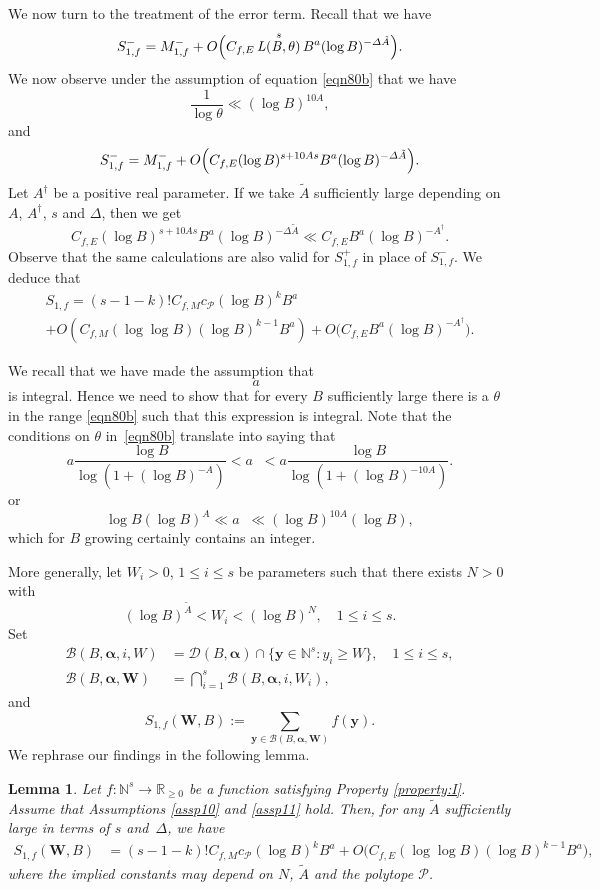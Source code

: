 \documentclass[11pt]{article}
\numberwithin{equation}{section}
\DeclareMathOperator{\LBt}{\mathit{L(B,\theta)}}
\newcommand{\cB}{\mathcal{B}}
\newcommand{\cD}{\mathcal{D}}
\newcommand{\cBalp}{\cD(B,\bfalp)}
\newcommand{\cBalpgen}[1]{\cB(B,\bfalp,#1)}
\newcommand{\cBalpW}{\cBalpgen{\bfW}}
\let\vardel\varDelta
\let\tet\theta
\newcommand{\bfy}{\boldsymbol{y}}
\newcommand{\bfalp}{\boldsymbol{\alpha}}
\newcommand{\bfW}{\boldsymbol{W}}
\newcommand{\calP}{\mathcal{P}}
\newcommand\NN{\mathbb{N}}
\newcommand{\N}{\mathbb{N}}
\newcommand\R{\mathbb{R}}
\newtheorem{lemma}[theorem]{Lemma}
\theoremstyle{definition}
\numberwithin{theorem}{section}
\begin{document}
We now turn to the treatment of the error term. Recall that we have
\[
S_{1,f}^-= M_{1,f}^- + O\Bigl(C_{f,E} \LBt^s B^{a} (\log B)^{-\vardel \tilde{A}}\Bigr).
\]
We now observe under the assumption of equation \eqref{eqn80b} that we have
\[
\frac{1}{\log \tet}\ll (\log B)^{10A},
\]
and
\[
S_{1,f}^-= M_{1,f}^- + O\Bigl(C_{f,E} (\log B)^{s+10As} B^{a} (\log B)^{-\vardel \tilde{A}}\Bigr).
\]
Let $A^\dagger$ be a positive real parameter. If we take $\tilde{A}$ sufficiently large depending on $A$, $A^\dagger$, $s$ and $\vardel$, then we get
\[
C_{f,E} (\log B)^{s+10As} B^{a} (\log B)^{-\vardel \tilde{A}} \ll C_{f,E} B^{a} (\log B)^{-A^\dagger}.
\]
Observe that the same calculations are also valid for $S_{1,f}^+$ in place of $S_{1,f}^-$. We deduce that
\begin{multline*}
S_{1,f}=(s-1-k)! C_{f,M}c_{\calP} (\log B)^kB^{a} \\
+O\left(C_{f,M}(\log \log B) (\log B)^{k-1} B^{a} \right) + O\bigl(C_{f,E} B^{a} (\log B)^{-A^\dagger}\bigr).
\end{multline*}

We recall that we have made the assumption that
\[
a \LBt
\]
is integral. Hence we need to show that for every $B$ sufficiently large there is a $\tet$ in the range \eqref{eqn80b} such that this expression is integral. Note that the conditions on $\tet$ in~\eqref{eqn80b} translate into saying that
\[
a \frac{\log B}{\log(1+(\log B)^{-A})}< a\LBt< a \frac{\log B}{\log (1+(\log B)^{-10A})}.
\]
or
\[
\log B (\log B)^A \ll a \LBt \ll (\log B)^{10A} (\log B),
\]
which for $B$ growing certainly contains an integer.\par

More generally, let $W_i>0$, $1\leq i\leq s$ be parameters such that there exists $N>0$ with
\[
(\log B)^{\tilde{A}}<W_i< (\log B)^N,\quad 1\leq i\leq s.
\]
Set
\begin{align*}
\cBalpgen{i,W}&=\cBalp\cap\{\bfy\in\NN^s: y_i \geq W\},\quad 1\leq i\leq s,\\
\cBalpW&=\bigcap_{i=1}^s\cBalpgen{i,W_i},
\end{align*}
and
\[
S_{1,f}(\bfW,B):= \sum_{\bfy\in\cBalpW}f(\bfy).
\]
We rephrase our findings in the following lemma.
\begin{lemma}\label{lem40}
Let $f: \N^s\rightarrow \R_{\geq 0}$ be a function satisfying Property \ref{property:I}. Assume that Assumptions \ref{assp10} and \ref{assp11} hold. Then, for any $\tilde A$ sufficiently large in terms of $s$ and~$\Delta$, we have
\begin{equation*}
\begin{split}
S_{1,f}(\bfW,B)&=(s-1-k)! C_{f,M}c_{\calP} (\log B)^kB^{a} +O\bigl(C_{f,E}(\log \log B) (\log B)^{k-1} B^{a} \bigr) ,
\end{split}
\end{equation*}
where the implied constants may depend on $N$, $\tilde{A}$ and the polytope $\calP$.
\end{lemma}
\end{document}
